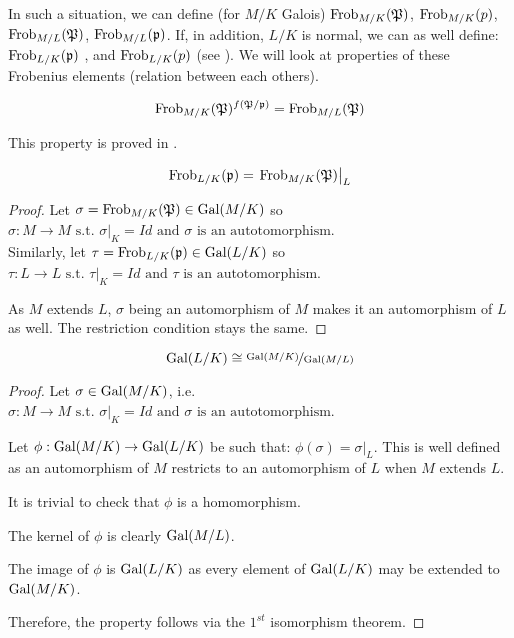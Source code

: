 In such a situation, we can define (for $M/K$ Galois)
$\text{Frob}_{M/K}(\mathfrak{P})$, 
$\text{Frob}_{M/K}(p)$, 
$\text{Frob}_{M/L}(\mathfrak{P})$, 
$\text{Frob}_{M/L}(\mathfrak{p})$.
If, in addition, $L/K$ is normal, we can as well define:
$\text{Frob}_{L/K}(\mathfrak{p})$ , and 
$\text{Frob}_{L/K}(p)$ (see \cite[p.99]{AlgebraicNumberFields}).
We will look at properties of these Frobenius elements (relation between each others).

\begin{property}
	$$
	\text{Frob}_{M/K}(\mathfrak{P})^{f(\mathfrak{P}/\mathfrak{p})} = \text{Frob}_{M/L}(\mathfrak{P})
	$$
\end{property}
This property is proved in \cite[p.99]{AlgebraicNumberFields}.

\begin{property}
	$$
	\text{Frob}_{L/K}(\mathfrak{p}) = \left. \text{Frob}_{M/K}(\mathfrak{P}) \right|_L
	$$
\end{property}
\begin{proof}
	Let $\sigma = \text{Frob}_{M/K}(\mathfrak{P}) \in \text{Gal}(M/K)$ so 
	$\sigma: M \to M \text{ s.t. } \left. \sigma \right|_K = Id \text{ and } \sigma \text{ is an autotomorphism}$.\\
	Similarly, let $\tau = \text{Frob}_{L/K}(\mathfrak{p}) \in \text{Gal}(L/K)$ so 
	$\tau: L \to L \text{ s.t. } \left. \tau \right|_K = Id \text{ and } \tau \text{ is an autotomorphism}$.
	
	As $M$ extends $L$, $\sigma$ being an automorphism of $M$ makes it an automorphism of $L$ as well.
	The restriction condition stays the same.
\end{proof}


\begin{property}
	$$
	\text{Gal}(L/K) \cong \nicefrac{\text{Gal}(M/K)}{\text{Gal}(M/L)}
	$$
\end{property}
\begin{proof}
	Let $\sigma \in \text{Gal}(M/K)$, i.e. $\sigma: M \to M \text{ s.t. } \left. \sigma \right|_K = Id \text{ and } \sigma \text{ is an autotomorphism}$.
	
	Let $\phi: \text{Gal}(M/K) \to \text{Gal}(L/K)$ be such that:
	$\phi(\sigma) = \left. \sigma \right|_L$.
	This is well defined as an automorphism of $M$ restricts to an automorphism of $L$ when $M$ extends $L$.
	
	It is trivial to check that $\phi$ is a homomorphism.
	
	The kernel of $\phi$ is clearly $\text{Gal}(M/L)$.
	
	The image of $\phi$ is $\text{Gal}(L/K)$ as every element of $\text{Gal}(L/K)$ may be extended to $\text{Gal}(M/K)$.
	
	Therefore, the property follows via the $1^{st}$ isomorphism theorem.
\end{proof}

